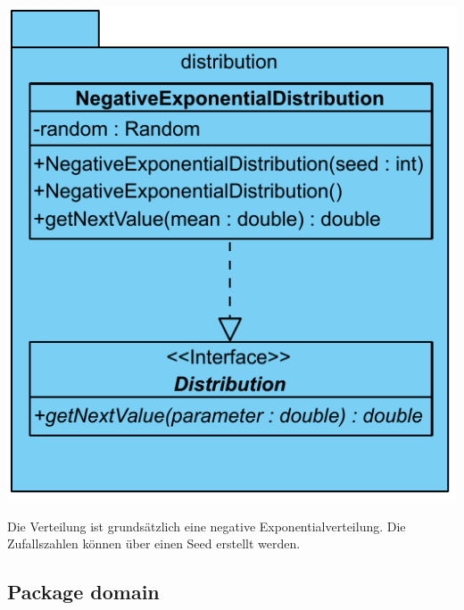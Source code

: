 \includegraphics[scale=0.5]{abbildungen/uml/distribution.pdf}

Die Verteilung ist grundsätzlich eine negative Exponentialverteilung. Die 
Zufallszahlen können über einen Seed erstellt werden.

\subsection{Package domain}

